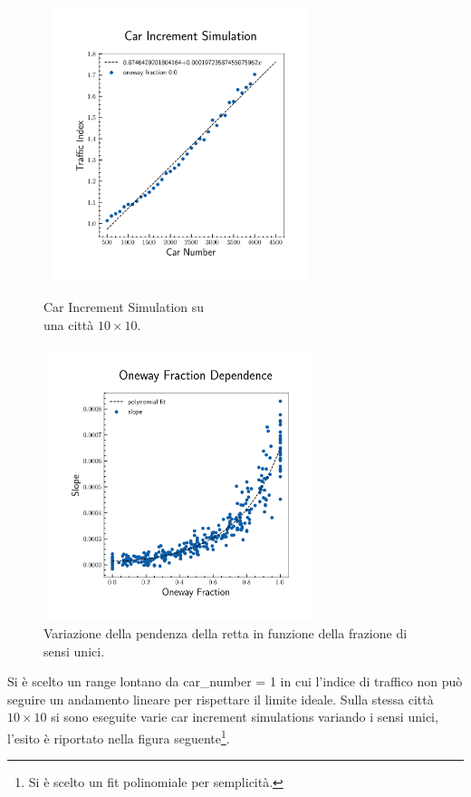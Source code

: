 \documentclass[main.tex]{subfiles}
\begin{document}
        \begin{figure}[H]
            \begin{minipage}{.5\textwidth}
                \centering
                \includegraphics[width=8cm, height=8cm]{car_increment.png}
                \caption{Car Increment Simulation su\\ una città $10 \times 10$.}
                \label{fig:9}
            \end{minipage}
            \begin{minipage}{.5\textwidth}
                \centering
                \includegraphics[width=8cm, height=8cm]{oneway_fraction_dependence.png}
                \caption{Variazione della pendenza della retta in funzione della frazione di sensi unici.}
                \label{fig:8}
            \end{minipage}
        \end{figure}

        Si è scelto un range lontano da car\_number = 1 in cui l'indice di traffico non può seguire un andamento lineare per rispettare il limite ideale.
        Sulla stessa città $10 \times 10$ si sono eseguite varie car increment simulations variando i sensi unici, l'esito è riportato nella figura seguente\footnote{Si è scelto un fit polinomiale per semplicità.}.
\end{document}
